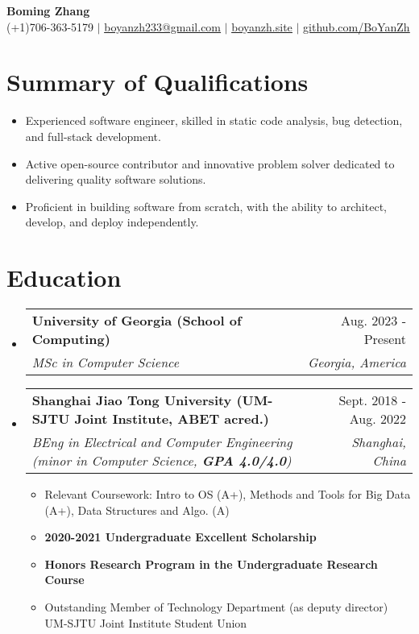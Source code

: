 \documentclass[letterpaper,11pt]{article}
\makeatletter
\newcommand{\resumeItem}[1]{
  \item\small{
    {#1 \vspace{-2pt}}
  }
}
\newcommand{\resumeSubHeader}[4]{
  \vspace{-2pt}\item
    \begin{tabular*}{0.98\textwidth}[t]{l@{\extracolsep{\fill}}r}
      \textbf{#1} & #2 \\
      \textit{\small#3} & \textit{\small #4} \\
    \end{tabular*}\vspace{-7pt}
}
\newcommand{\resumeSubHeaderListStart}{\begin{itemize}[leftmargin=0.15in, label={}]}
\newcommand{\resumeSubHeaderListEnd}{\end{itemize}}
\newcommand{\resumeItemListStart}{\begin{itemize}}
\newcommand{\resumeItemListEnd}{\end{itemize}\vspace{-5pt}}
\makeatother
\begin{document}


\begin{center}
    \textbf{\Huge Boming Zhang} \\ \vspace{1pt}
    \small (+1)706-363-5179 $|$ \href{mailto:boyanzh233@gmail.com}{\underline{boyanzh233@gmail.com}} $|$
    \href{https://boyanzh.site}{\underline{boyanzh.site}} $|$
    \href{https://github.com/BoYanZh}{\underline{github.com/BoYanZh}}
\end{center}


\section{Summary of Qualifications}
\resumeItemListStart
  \setlength\itemsep{0em}
  \resumeItem{Experienced software engineer, skilled in static code analysis, bug detection, and full-stack development.}
  \resumeItem{Active open-source contributor and innovative problem solver dedicated to delivering quality software solutions.}
  \resumeItem{Proficient in building software from scratch, with the ability to architect, develop, and deploy independently.}
\resumeItemListEnd

\vspace{-10pt}
\section{Education}
  \resumeSubHeaderListStart
    \resumeSubHeader
      {University of Georgia (School of Computing)}{Aug. 2023 - Present}
      {MSc in Computer Science}{Georgia, America}
    \resumeSubHeader
      {Shanghai Jiao Tong University (UM-SJTU Joint Institute, ABET acred.)}{Sept. 2018 - Aug. 2022}
      {BEng in Electrical and Computer Engineering (minor in Computer Science, \textbf{GPA 4.0/4.0})}{Shanghai, China}
          \resumeItemListStart
            \resumeItem{Relevant Coursework: Intro to OS (A+), Methods and Tools for Big Data (A+), Data Structures and Algo. (A)}
            \resumeItem{\textbf{2020-2021 Undergraduate Excellent Scholarship}}
            \resumeItem{\textbf{Honors Research Program in the Undergraduate Research Course}}
            \resumeItem{Outstanding Member of Technology Department (as deputy director) UM-SJTU Joint Institute Student Union}
          \resumeItemListEnd
  \resumeSubHeaderListEnd
\end{document}
